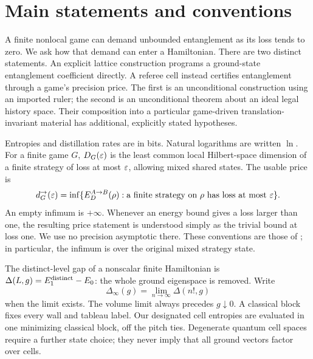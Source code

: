 \section{Main statements and conventions}\label{sec:main}
A finite nonlocal game can demand unbounded entanglement as its loss tends
to zero. We ask how that demand can enter a Hamiltonian. There are two
distinct statements. An explicit lattice construction programs a
ground-state entanglement coefficient directly. A referee cell instead
certifies entanglement through a game's precision price. The first is
an unconditional construction using an imported ruler; the second is an
unconditional theorem about an ideal legal history space. Their
composition into a particular game-driven translation-invariant material
has additional, explicitly stated hypotheses.

Entropies and distillation rates are in bits. Natural logarithms are
written $\ln$. For a finite game $G$, $D_G(\varepsilon)$ is the least common
local Hilbert-space dimension of a finite strategy of loss at most
$\varepsilon$, allowing mixed shared states. The usable price is
\begin{equation}\label{eq:price}
 d_G^{\to}(\varepsilon)=\inf\{E_D^{A\to B}(\rho):\text{a finite strategy on $\rho$ has loss at most $\varepsilon$}\}.
\end{equation}
An empty infimum is $+\infty$. Whenever an energy bound gives a loss
larger than one, the resulting price statement is understood simply as
the trivial bound at loss one. We use no precision asymptotic there.
These conventions are those of \cite{precision,unprice}; in particular,
the infimum is over the original mixed strategy state.

The distinct-level gap of a nonscalar finite Hamiltonian is
$\Delta(L,g)=E_1^{\rm distinct}-E_0$: the whole ground eigenspace is
removed. Write
\[
 \Delta_\infty(g)=\lim_{n\to\infty}\Delta(n!,g)
\]
when the limit exists. The volume limit always precedes $g\downarrow0$.
A classical block fixes every wall and tableau label. Our designated
cell entropies are evaluated in one minimizing classical block, off the
pitch ties. Degenerate quantum cell spaces require a further state
choice; they never imply that all ground vectors factor over cells.


